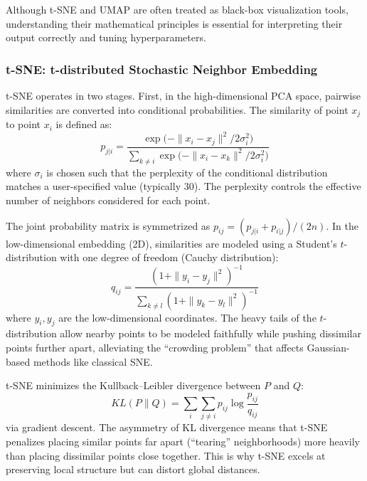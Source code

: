 Although t-SNE and UMAP are often treated as black-box visualization tools,
understanding their mathematical principles is essential for interpreting their
output correctly and tuning hyperparameters.

\subsubsection{t-SNE: t-distributed Stochastic Neighbor Embedding}

t-SNE operates in two stages. First, in the high-dimensional PCA space, pairwise
similarities are converted into conditional probabilities. The similarity of
point $x_j$ to point $x_i$ is defined as:
\begin{equation}
  \label{eq:scrnaseq:tsne_pij}
  p_{j|i} = \frac{\exp\!\bigl(-\|x_i - x_j\|^2 / 2\sigma_i^2\bigr)}
    {\sum_{k \neq i} \exp\!\bigl(-\|x_i - x_k\|^2 / 2\sigma_i^2\bigr)}
\end{equation}
where $\sigma_i$ is chosen such that the perplexity of the conditional
distribution matches a user-specified value (typically 30). The perplexity
controls the effective number of neighbors considered for each point.

The joint probability matrix is symmetrized as
$p_{ij} = (p_{j|i} + p_{i|j}) / (2n)$. In the low-dimensional embedding
(2D), similarities are modeled using a Student's $t$-distribution with one
degree of freedom (Cauchy distribution):
\begin{equation}
  \label{eq:scrnaseq:tsne_qij}
  q_{ij} = \frac{(1 + \|y_i - y_j\|^2)^{-1}}
    {\sum_{k \neq l} (1 + \|y_k - y_l\|^2)^{-1}}
\end{equation}
where $y_i, y_j$ are the low-dimensional coordinates. The heavy tails of the
$t$-distribution allow nearby points to be modeled faithfully while pushing
dissimilar points further apart, alleviating the ``crowding problem'' that
affects Gaussian-based methods like classical SNE.

t-SNE minimizes the Kullback--Leibler divergence between $P$ and $Q$:
\begin{equation}
  \label{eq:scrnaseq:tsne_kl}
  KL(P \| Q) = \sum_i \sum_{j \neq i} p_{ij}
    \log \frac{p_{ij}}{q_{ij}}
\end{equation}
via gradient descent. The asymmetry of KL divergence means that t-SNE penalizes
placing similar points far apart (``tearing'' neighborhoods) more heavily than
placing dissimilar points close together. This is why t-SNE excels at preserving
local structure but can distort global distances.

